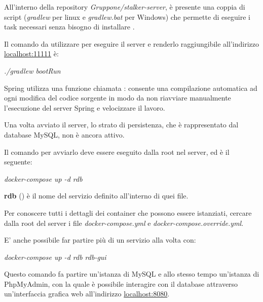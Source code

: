 \documentclass[../manuale-manutentore.tex]{subfiles}
\begin{document}
All'interno della repository \textit{Gruppone/stalker-server}, è presente una coppia di script (\textit{gradlew} per linux e \textit{gradlew.bat} per Windows) che permette di eseguire i task necessari senza bisogno di installare .

Il comando da utilizzare per eseguire il server e renderlo raggiungibile all'indirizzo \href{localhost:11111}{localhost:11111} è: \par\bigskip

\begin{center}
  \textit{./gradlew bootRun}
\end{center}
\par\bigskip

Spring utilizza una funzione chiamata : consente una compilazione automatica ad ogni modifica del codice sorgente in modo da non riavviare manualmente l'esecuzione del server Spring e velocizzare il lavoro.

Una volta avviato il server, lo strato di persistenza, che è rappresentato dal database MySQL, non è ancora attivo.

Il comando per avviarlo deve essere eseguito dalla root nel server, ed è il seguente: \par\bigskip

\begin{center}
  \textit{docker-compose up -d rdb}
\end{center}
\par\bigskip

\textbf{rdb} () è il nome del servizio definito all'interno di quei file.

Per conoscere tutti i dettagli dei container che possono essere istanziati, cercare dalla root del server i file \emph{docker-compose.yml} e \emph{docker-compose.override.yml}.

E' anche possibile far partire più di un servizio alla volta con: \par\bigskip

\begin{center}
  \textit{docker-compose up -d rdb rdb-gui}
\end{center}

\par\bigskip

Questo comando fa partire un'istanza di MySQL e allo stesso tempo un'istanza di PhpMyAdmin, con la quale è possibile interagire con il database attraverso un'interfaccia grafica web all'indirizzo \href{localhost:8080}{localhost:8080}.
\end{document}
